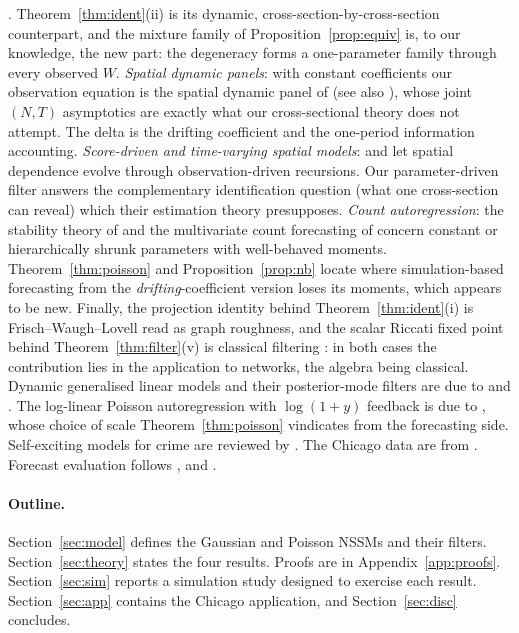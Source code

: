 \documentclass[12pt]{article}
\theoremstyle{plain}
\theoremstyle{definition}
\theoremstyle{remark}
\begin{document}
\citet{case1991spatial,lee2004asymptotic,blume2015linear}. Theorem~\ref{thm:ident}(ii) is its dynamic, cross-section-by-cross-section counterpart, and the mixture family of Proposition~\ref{prop:equiv} is, to our knowledge, the new part: the degeneracy forms a one-parameter family through every observed $W$. \emph{Spatial dynamic panels}: with constant coefficients our observation equation is the spatial dynamic panel of \citet{yu2008quasi} (see also \citealp{elhorst2014spatial}), whose joint $(N,T)$ asymptotics are exactly what our cross-sectional theory does not attempt. The delta is the drifting coefficient and the one-period information accounting. \emph{Score-driven and time-varying spatial models}: \citet{blasques2016spillover} and \citet{catania2017dynamic} let spatial dependence evolve through observation-driven recursions. Our parameter-driven filter answers the complementary identification question (what one cross-section can reveal) which their estimation theory presupposes. \emph{Count autoregression}: the stability theory of \citet{fokianos2009poisson} and the multivariate count forecasting of \citet{berry2020bayesian} concern constant or hierarchically shrunk parameters with well-behaved moments. Theorem~\ref{thm:poisson} and Proposition~\ref{prop:nb} locate where simulation-based forecasting from the \emph{drifting}-coefficient version loses its moments, which appears to be new. Finally, the projection identity behind Theorem~\ref{thm:ident}(i) is Frisch--Waugh--Lovell \citep{frisch1933partial,lovell1963seasonal} read as graph roughness, and the scalar Riccati fixed point behind Theorem~\ref{thm:filter}(v) is classical filtering \citep{harvey1989forecasting,anderson1979optimal}: in both cases the contribution lies in the application to networks, the algebra being classical. Dynamic generalised linear models and their posterior-mode filters are due to \citet{west1985dynamic} and \citet{fahrmeir1992posterior}. The log-linear Poisson autoregression with $\log(1+y)$ feedback is due to \citet{fokianos2011log}, whose choice of scale Theorem~\ref{thm:poisson} vindicates from the forecasting side. Self-exciting models for crime are reviewed by \citet{mohler2011self}. The Chicago data are from \citet{clark2021class}. Forecast evaluation follows \citet{diebold1995comparing}, \citet{gneiting2007strictly} and \citet{czado2009predictive}.

\paragraph{Outline.} Section~\ref{sec:model} defines the Gaussian and Poisson NSSMs and their filters. Section~\ref{sec:theory} states the four results. Proofs are in Appendix~\ref{app:proofs}. Section~\ref{sec:sim} reports a simulation study designed to exercise each result. Section~\ref{sec:app} contains the Chicago application, and Section~\ref{sec:disc} concludes.
\end{document}
